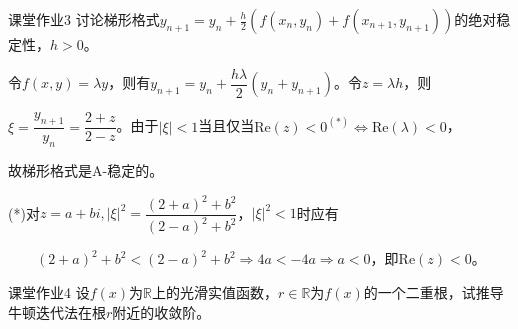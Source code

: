 \documentclass[10pt]{beamer}
\begin{document}
    \begin{frame}{课堂作业3}
        讨论梯形格式$y_{n+1}=y_n+\frac h2(f(x_n,y_n)+f(x_{n+1},y_{n+1}))$的绝对稳定性，$h>0$。\vspace{1cm}

        \pause 令$f(x,y)=\lambda y$，则有$y_{n+1}=y_n+\dfrac{h\lambda}2(y_n+y_{n+1})$。令$z=\lambda h$，则

        \pause $\xi=\dfrac{y_{n+1}}{y_n}=\dfrac{2+z}{2-z}$。由于$|\xi|<1$当且仅当$\mathrm{Re}(z)<0^{(*)}\Leftrightarrow\mathrm{Re}(\lambda)<0$，

        \pause 故梯形格式是A-稳定的。\vspace{0.5cm}

        \pause (*)对$z=a+bi,|\xi|^2=\dfrac{(2+a)^2+b^2}{(2-a)^2+b^2}$，$|\xi|^2<1$时应有

        \pause $\qquad(2+a)^2+b^2<(2-a)^2+b^2\Rightarrow 4a<-4a\Rightarrow a<0$，即$\mathrm{Re}(z)<0$。

    \end{frame}
    \begin{frame}{课堂作业4}
        设$f(x)$为$\mathbb{R}$上的光滑实值函数，$r\in\mathbb{R}$为$f(x)$的一个二重根，试推导牛顿迭代法在根$r$附近的收敛阶。
    \end{frame}
\end{document}
